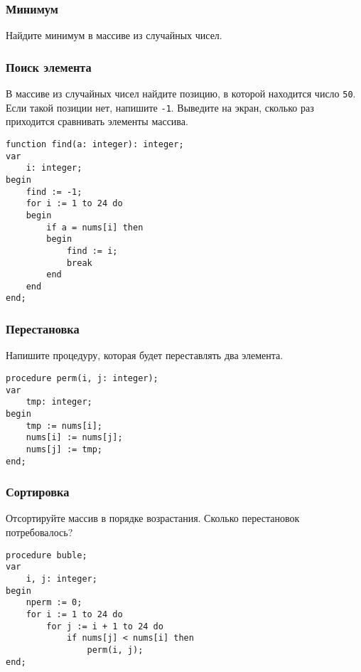 \documentclass[10,a4paper]{article}
\begin{document}
\subsubsection{Минимум}
Найдите минимум в массиве из случайных чисел.
\subsubsection{Поиск элемента}
В массиве из случайных чисел найдите позицию, в которой находится число
\texttt{50}. Если такой позиции нет, напишите \texttt{-1}. Выведите на
экран, сколько раз приходится сравнивать элементы массива.
\begin{lstlisting}
function find(a: integer): integer;
var
    i: integer;
begin
    find := -1;
    for i := 1 to 24 do
    begin
        if a = nums[i] then
        begin
            find := i;
            break
        end
    end 
end;
\end{lstlisting}
\subsubsection{Перестановка}
Напишите процедуру, которая будет переставлять два элемента.
\begin{lstlisting}
procedure perm(i, j: integer);
var
    tmp: integer;
begin
    tmp := nums[i];
    nums[i] := nums[j];
    nums[j] := tmp;
end;
\end{lstlisting}
\subsubsection{Сортировка}
Отсортируйте массив в порядке возрастания. Сколько перестановок
потребовалось?
\begin{lstlisting}
procedure buble;
var
    i, j: integer;
begin
    nperm := 0;
    for i := 1 to 24 do
        for j := i + 1 to 24 do
            if nums[j] < nums[i] then
                perm(i, j);
end;
\end{lstlisting}
\end{document}
